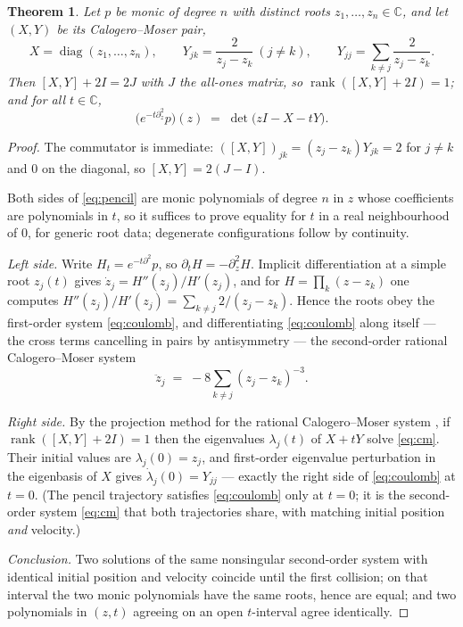 \documentclass[11pt]{amsart}
\newtheorem{theorem}{Theorem}[section]
\theoremstyle{remark}
\newcommand{\C}{\mathbb{C}}
\begin{document}
\begin{theorem}\label{thm:pencil}
Let $p$ be monic of degree $n$ with distinct roots $z_1,\dots,z_n\in\C$, and let $(X,Y)$ be its Calogero--Moser pair,
\[
X=\operatorname{diag}(z_1,\dots,z_n),\qquad
Y_{jk}=\frac{2}{z_j-z_k}\ (j\ne k),\qquad
Y_{jj}=\sum_{k\ne j}\frac{2}{z_j-z_k}.
\]
Then $[X,Y]+2I=2J$ with $J$ the all-ones matrix, so $\operatorname{rank}([X,Y]+2I)=1$; and for all $t\in\C$,
\begin{equation}\label{eq:pencil}
\bigl(e^{-t\partial_z^2}p\bigr)(z)\;=\;\det\bigl(zI-X-tY\bigr).
\end{equation}
\end{theorem}

\begin{proof}
The commutator is immediate: $([X,Y])_{jk}=(z_j-z_k)Y_{jk}=2$ for $j\ne k$ and $0$ on the diagonal, so $[X,Y]=2(J-I)$.

Both sides of \eqref{eq:pencil} are monic polynomials of degree $n$ in $z$ whose coefficients are polynomials in $t$, so it suffices to prove equality for $t$ in a real neighbourhood of $0$, for generic root data; degenerate configurations follow by continuity.

\emph{Left side.} Write $H_t=e^{-t\partial^2}p$, so $\partial_t H=-\partial_z^2 H$. Implicit differentiation at a simple root $z_j(t)$ gives $\dot z_j=H''(z_j)/H'(z_j)$, and for $H=\prod_k(z-z_k)$ one computes $H''(z_j)/H'(z_j)=\sum_{k\ne j}2/(z_j-z_k)$. Hence the roots obey the first-order system \eqref{eq:coulomb}, and differentiating \eqref{eq:coulomb} along itself --- the cross terms cancelling in pairs by antisymmetry --- the second-order rational Calogero--Moser system
\begin{equation}\label{eq:cm}
\ddot z_j \;=\; -8\sum_{k\ne j}(z_j-z_k)^{-3}.
\end{equation}

\emph{Right side.} By the projection method for the rational Calogero--Moser system \cite{AMM,KKS,Moser}, if $\operatorname{rank}([X,Y]+2I)=1$ then the eigenvalues $\lambda_j(t)$ of $X+tY$ solve \eqref{eq:cm}. Their initial values are $\lambda_j(0)=z_j$, and first-order eigenvalue perturbation in the eigenbasis of $X$ gives $\dot\lambda_j(0)=Y_{jj}$ --- exactly the right side of \eqref{eq:coulomb} at $t=0$. (The pencil trajectory satisfies \eqref{eq:coulomb} only at $t=0$; it is the second-order system \eqref{eq:cm} that both trajectories share, with matching initial position \emph{and} velocity.)

\emph{Conclusion.} Two solutions of the same nonsingular second-order system with identical initial position and velocity coincide until the first collision; on that interval the two monic polynomials have the same roots, hence are equal; and two polynomials in $(z,t)$ agreeing on an open $t$-interval agree identically.
\end{proof}
\end{document}
